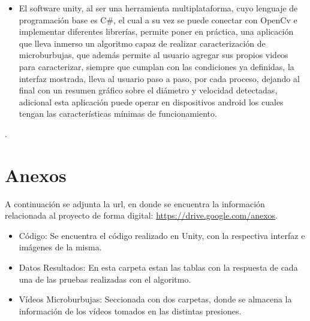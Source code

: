 \documentclass[12pt,twocolumn,a4paper]{article}
\begin{document}
\begin{itemize}
\item El software unity, al ser una herramienta multiplataforma, cuyo lenguaje de programación base es C\#, el cual a su vez se puede conectar con OpenCv e implementar diferentes librerías, permite poner en práctica, una aplicación que lleva inmerso un algoritmo capaz de realizar caracterización de microburbujas, que además permite al usuario agregar sus propios videos para caracterizar, siempre que cumplan con las condiciones ya definidas, la interfaz mostrada, lleva al usuario paso a paso, por cada proceso, dejando al final con un resumen gráfico sobre el diámetro y velocidad detectadas, adicional esta aplicación puede operar en dispositivos android los cuales tengan las características mínimas de funcionamiento.
\end{itemize}.

\section{Anexos}

A continuación se adjunta la url, en donde se encuentra la información relacionada al proyecto de forma digital: \href{https://drive.google.com/drive/folders/1hJ9imBQWQzY1E9KuaZIGZMbAZRW3Hgjz?usp=share_link}{https://drive.google.com/anexos}.

\begin{itemize}
\item Código: Se encuentra el código realizado en Unity, con la respectiva interfaz e imágenes de la misma. 

\item Datos Resultados: En esta carpeta estan las tablas con la respuesta de cada una de las pruebas realizadas con el algoritmo. 

\item Vídeos Microburbujas: Seccionada con dos carpetas, donde se almacena la información de los vídeos tomados en las distintas presiones. 


\end{itemize}




\newpage
\end{document}
